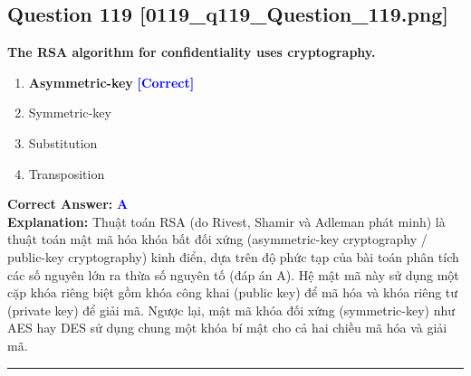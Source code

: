 \documentclass[11pt,a4paper]{article}
\begin{document}
\begin{minipage}{\textwidth}
\subsection*{Question 119 \quad \footnotesize{[0119\_q119\_Question\_119.png]}}
\noindent \textbf{The RSA algorithm for confidentiality uses cryptography.}

\begin{enumerate}[label=\Alph*.]
    \item \textbf{Asymmetric-key} \hfill \textcolor{blue}{\textbf{[Correct]}}
    \item Symmetric-key
    \item Substitution
    \item Transposition
\end{enumerate}

\noindent \textbf{Correct Answer:} \textcolor{blue}{\textbf{A}} \\[2pt]
\noindent \textbf{Explanation:} Thuật toán RSA (do Rivest, Shamir và Adleman phát minh) là thuật toán mật mã hóa khóa bất đối xứng (asymmetric-key cryptography / public-key cryptography) kinh điển, dựa trên độ phức tạp của bài toán phân tích các số nguyên lớn ra thừa số nguyên tố (đáp án A). Hệ mật mã này sử dụng một cặp khóa riêng biệt gồm khóa công khai (public key) để mã hóa và khóa riêng tư (private key) để giải mã. Ngược lại, mật mã khóa đối xứng (symmetric-key) như AES hay DES sử dụng chung một khóa bí mật cho cả hai chiều mã hóa và giải mã.

\par\vspace{0.3cm}
\hrule
\vspace{0.3cm}
\end{minipage}
\end{document}

